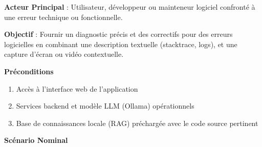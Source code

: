 \documentclass[12pt,a4paper]{report}
\begin{document}
	\textbf{Acteur Principal} : Utilisateur, développeur ou mainteneur logiciel confronté à une erreur technique ou fonctionnelle.	
	
	\textbf{Objectif} : Fournir un diagnostic précis et des correctifs pour des erreurs logicielles en combinant une description textuelle (stacktrace, logs), et une capture d'écran ou vidéo contextuelle.
	
	\textbf{Préconditions}
	
	\begin{enumerate}
		\item Accès à l'interface web de l'application
		\item Services backend et modèle LLM (Ollama) opérationnels
		\item Base de connaissances locale (RAG) préchargée avec le code source pertinent
	\end{enumerate}
	
	\textbf{Scénario Nominal}
	
\end{document}
